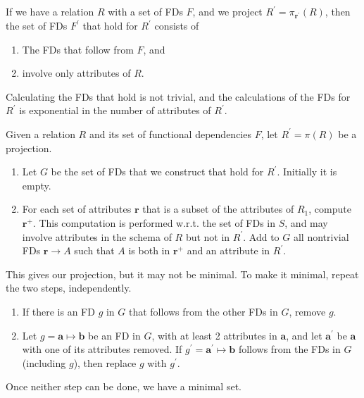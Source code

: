     If we have a relation $R$ with a set of FDs $F$, and we project $R^\prime = \pi_{\mathbf{r}^\prime} (R)$, then the set of FDs $F^\prime$ that hold for $R^\prime$ consists of 
    \begin{enumerate}
      \item The FDs that follow from $F$, and 
      \item involve only attributes of $R$. 
    \end{enumerate} 

    Calculating the FDs that hold is not trivial, and the calculations of the FDs for $R^\prime$ is exponential in the number of attributes of $R^\prime$. 

    \begin{theorem}
      \label{thm:calculating-projections-of-functional}
      Given a relation $R$ and its set of functional dependencies $F$, let $R^\prime = \pi(R)$ be a projection. 
      \begin{enumerate}
        \item Let $G$ be the set of FDs that we construct that hold for $R^\prime$. Initially it is empty. 
        \item For each set of attributes $\mathbf{r}$ that is a subset of the attributes of $R_1$, compute $\mathbf{r}^+$. This computation is performed w.r.t. the set of FDs in $S$, and may involve attributes in the schema of $R$ but not in $R^\prime$. Add to $G$ all nontrivial FDs $\mathbf{r} \rightarrow A$ such that $A$ is both in $\mathbf{r}^+$ and an attribute in $R^\prime$. 
      \end{enumerate}
      This gives our projection, but it may not be minimal. To make it minimal, repeat the two steps, independently. 
      \begin{enumerate}
        \item If there is an FD $g$ in $G$ that follows from the other FDs in $G$, remove $g$. 
        \item Let $g = \mathbf{a} \mapsto \mathbf{b} $ be an FD in $G$, with at least 2 attributes in $\mathbf{a}$, and let $\mathbf{a}^\prime$ be $\mathbf{a}$ with one of its attributes removed. If $g^\prime = \mathbf{a}^\prime \mapsto \mathbf{b}$ follows from the FDs in $G$ (including $g$), then replace $g$ with $g^\prime$. 
      \end{enumerate}
      Once neither step can be done, we have a minimal set. 
    \end{theorem}

